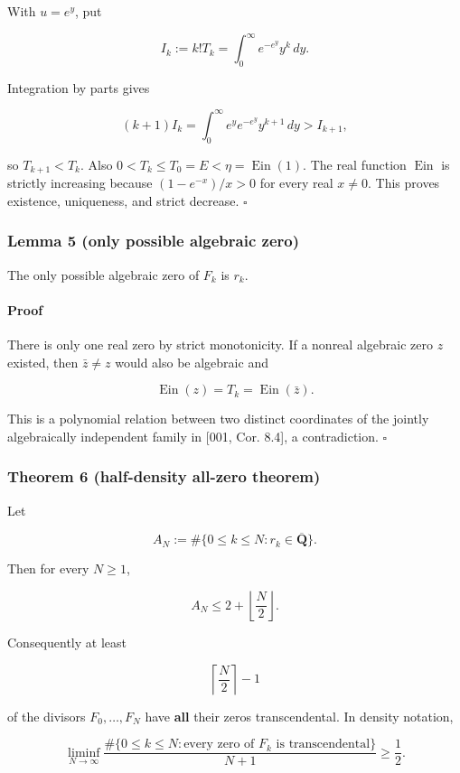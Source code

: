 \documentclass[11pt]{article}
\theoremstyle{keio}
\theoremstyle{definition}
\theoremstyle{remark}
\newcommand{\Ein}{\operatorname{Ein}}
\begin{document}
With \(u=e^y\), put

\[
 I_k:=k!T_k=\int_0^\infty e^{-e^y}y^k\,dy.
\]

Integration by parts gives

\[
 (k+1)I_k
 =\int_0^\infty e^y e^{-e^y}y^{k+1}\,dy>I_{k+1},
\]

so \(T_{k+1}<T_k\). Also \(0<T_k\le T_0=E<\eta=\Ein(1)\).
The real function \(\Ein\) is strictly increasing because
\((1-e^{-x})/x>0\) for every real \(x\ne0\). This proves existence,
uniqueness, and strict decrease. \(\square\)

\subsubsection{Lemma 5 (only possible algebraic zero)}

The only possible algebraic zero of \(F_k\) is \(r_k\).

\paragraph{Proof}

There is only one real zero by strict monotonicity. If a nonreal algebraic
zero \(z\) existed, then \(\bar z\ne z\) would also be algebraic and

\[
 \Ein(z)=T_k=\Ein(\bar z).
\]

This is a polynomial relation between two distinct coordinates of the
jointly algebraically independent family in {[}001, Cor. 8.4{]}, a contradiction.
\(\square\)

\subsubsection{Theorem 6 (half-density all-zero theorem)}

Let

\[
 A_N:=\#\{0\le k\le N:r_k\in\overline{\mathbf Q}\}.
\]

Then for every \(N\ge1\),

\[
 \boxed{A_N\le2+\left\lfloor\frac N2\right\rfloor.}                         \tag{GT-13}
\]

Consequently at least

\[
 \boxed{\left\lceil\frac N2\right\rceil-1}                                 \tag{GT-14}
\]

of the divisors \(F_0,\ldots,F_N\) have \textbf{all} their zeros transcendental.
In density notation,

\[
 \liminf_{N\to\infty}
 \frac{\#\{0\le k\le N:\text{every zero of }F_k\text{ is transcendental}\}}
 {N+1}\ge\frac12.                                                           \tag{GT-15}
\]
\end{document}
